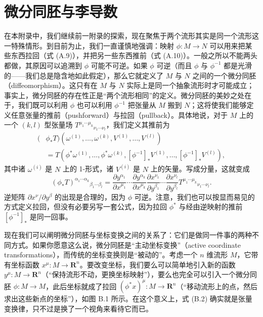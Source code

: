 \chapter{微分同胚与李导数}

在本附录中，我们继续前一附录的探索，现在聚焦于两个流形其实是同一个流形这一特殊情形。到目前为止，我们一直谨慎地强调：映射 $\phi: M \to N$ 可以用来把某些东西拉回（式 (A.9)），并把另一些东西推前（式 (A.10)）。一般之所以不能两头都做，其原因可以追溯到 $\phi$ 可能不可逆。如果 $\phi$ 可逆（而且 $\phi$ 与 $\phi^{-1}$ 都是光滑的——我们总是隐含地如此假定），那么它就定义了 $M$ 与 $N$ 之间的一个微分同胚（diffeomorphism）。这只有在 $M$ 与 $N$ 实际上是同一个抽象流形时才可能成立；事实上，微分同胚的存在性正是“两个流形相同”的定义。微分同胚的美妙之处在于，我们既可以利用 $\phi$ 也可以利用 $\phi^{-1}$ 把张量从 $M$ 搬到 $N$；这将使我们能够定义任意张量的推前（pushforward）与拉回（pullback）。具体地说，对于 $M$ 上的一个 $(k,l)$ 型张量场 $T^{\mu_1\cdots\mu_k}{}_{\nu_1\cdots\nu_l}$，我们定义其推前为
\begin{equation*}
\begin{aligned}
(&\phi_* T)(\omega^{(1)}, \ldots, \omega^{(k)}, V^{(1)}, \ldots, V^{(l)}) \\
&= T(\phi^*\omega^{(1)}, \ldots, \phi^*\omega^{(k)}, [\phi^{-1}]_* V^{(1)}, \ldots, [\phi^{-1}]_* V^{(l)}),
\end{aligned}
\tag{B.1}
\end{equation*}
其中诸 $\omega^{(i)}$ 是 $N$ 上的 1-形式，诸 $V^{(i)}$ 是 $N$ 上的矢量。写成分量，这就变成
\begin{equation*}
(\phi_* T)^{\alpha_1\cdots\alpha_k}{}_{\beta_1\cdots\beta_l}
= \frac{\partial y^{\alpha_1}}{\partial x^{\mu_1}} \cdots \frac{\partial y^{\alpha_k}}{\partial x^{\mu_k}}
\frac{\partial x^{\nu_1}}{\partial y^{\beta_1}} \cdots \frac{\partial x^{\nu_l}}{\partial y^{\beta_l}}
T^{\mu_1\cdots\mu_k}{}_{\nu_1\cdots\nu_l}.
\tag{B.2}
\end{equation*}
逆矩阵 $\partial x^\nu/\partial y^\beta$ 的出现是合理的，因为 $\phi$ 可逆。注意，我们也可以按显而易见的方式定义拉回，但没有必要另写一套公式，因为拉回 $\phi^*$ 与经由逆映射的推前 $[\phi^{-1}]_*$ 是同一回事。

现在我们可以阐明微分同胚与坐标变换之间的关系了：它们是做同一件事的两种不同方式。如果你愿意这么说，微分同胚是“主动坐标变换”（active coordinate transformations），而传统的坐标变换则是“被动的”。考虑一个 $n$ 维流形 $M$，它带有坐标函数 $x^\mu : M \to \mathbf{R}^n$。要改变坐标，我们要么可以简单地引入新的函数 $y^\mu : M \to \mathbf{R}^n$（“保持流形不动，更换坐标映射”），要么也完全可以引入一个微分同胚 $\phi : M \to M$，此后坐标就成了拉回 $(\phi^* x)^\mu : M \to \mathbf{R}^n$（“移动流形上的点，然后求出这些新点的坐标”），如图 B.1 所示。在这个意义上，式 (B.2) 确实就是张量变换律，只不过是换了一个视角来看待它而已。

